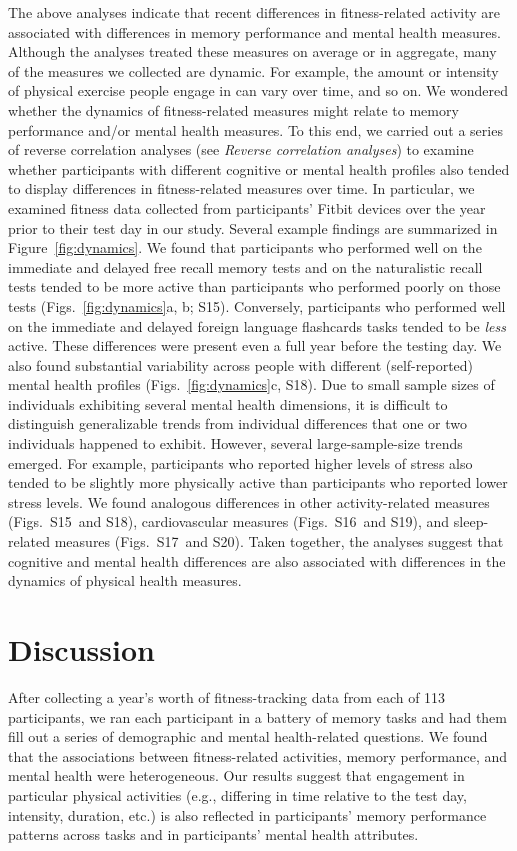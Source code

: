 \documentclass[10pt]{article}
\newcommand{\activityTimecourse}{S15}
\newcommand{\cardioTimecourse}{S16}
\newcommand{\sleepTimecourse}{S17}
\newcommand{\activityTimecourseMH}{S18}
\newcommand{\cardioTimecourseMH}{S19}
\newcommand{\sleepTimecourseMH}{S20}
\begin{document}
The above analyses indicate that recent differences in fitness-related
activity are associated with differences in memory performance and
mental health measures.  Although the analyses treated these measures
on average or in aggregate, many of the measures we collected are
dynamic. For example, the amount or intensity of physical exercise
people engage in can vary over time, and so on.  We wondered whether
the dynamics of fitness-related measures might relate to memory
performance and/or mental health measures.  To this end, we carried out a
series of reverse correlation analyses (see \textit{Reverse
  correlation analyses}) to examine whether participants with
different cognitive or mental health profiles also tended to display
differences in fitness-related measures over time.  In particular, we
examined fitness data collected from participants' Fitbit devices over
the year prior to their test day in our study.  Several example findings are summarized in
Figure~\ref{fig:dynamics}.  We found that participants who performed
well on the immediate and delayed free recall memory tests and on the
naturalistic recall tests tended to be more active than participants
who performed poorly on those tests (Figs.~\ref{fig:dynamics}a, b;
\activityTimecourse).  Conversely, participants who performed well on
the immediate and delayed foreign language flashcards tasks tended to
be \textit{less} active.  These differences were present even a full
year before the testing day.  We also found substantial variability
across people with different (self-reported) mental health profiles
(Figs.~\ref{fig:dynamics}c, \activityTimecourseMH).  Due to small sample
sizes of individuals exhibiting several mental health dimensions, it
is difficult to distinguish generalizable trends from individual
differences that one or two individuals happened to exhibit.  However,
several large-sample-size trends emerged.  For example, participants
who reported higher levels of stress also tended to be slightly more
physically active than participants who reported lower stress levels.
We found analogous differences in other activity-related measures
(Figs.~\activityTimecourse~and \activityTimecourseMH), cardiovascular
measures (Figs.~\cardioTimecourse~and \cardioTimecourseMH), and
sleep-related measures (Figs.~\sleepTimecourse~and
\sleepTimecourseMH).  Taken together, the analyses suggest that
cognitive and mental health differences are also associated with differences
in the dynamics of physical health measures.


\section*{Discussion}
After collecting a year's worth of fitness-tracking data from each of 113
participants, we ran each participant in a battery of memory tasks and
had them fill out a series of demographic and mental health-related
questions.  We found that the associations between fitness-related
activities, memory performance, and mental health were heterogeneous.
Our results suggest that engagement in particular physical
activities (e.g., differing in time relative to the
test day, intensity, duration, etc.) is also reflected in participants'
memory performance patterns across tasks and in participants' mental
health attributes.
\end{document}
